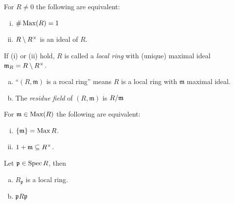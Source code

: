 \documentclass[a4paper]{report}
\begin{document}
\begin{thm-defi}
  For $R \ne 0$ the following are equivalent:
  \begin{enumerate}[(i)]
    \item $\#\operatorname{Max}(R)= 1$
    \item $R \setminus R^\times$ is an ideal of $R$.
  \end{enumerate}
  If (i) or (ii) hold, $R$ is called a \emph{local ring} with (unique) maximal ideal $\mathfrak m_{R} = R \setminus R^\times$.
\end{thm-defi}

\begin{nota*}
\begin{enumerate}[(a)]
  \item ``$(R,\mathfrak m)$ is a rocal ring'' means $R$ is a local ring with $\mathfrak m$ maximal ideal.
        \item The \emph{residue field} of $(R, \mathfrak m)$ is $\fak R{\mathfrak{m}}$
\end{enumerate}
\end{nota*}

\begin{exer}
  For $\mathfrak m \in \operatorname{Max} (R)$ the following are equivalent:
  \begin{enumerate}[(i)]
    \item $\{\mathfrak m\} = \operatorname{Max} R$.
          \item $1 + \mathfrak m \subseteq R^\times$.
  \end{enumerate}

\end{exer}

\begin{prop}
  Let $\mathfrak p \in \operatorname{Spec} R$, then
  \begin{enumerate}[(a)]
    \item $R_{\mathfrak p}$ is a local ring.
          \item $\mathfrak p R \mathfrak p$
  \end{enumerate}

\end{prop}
\end{document}
